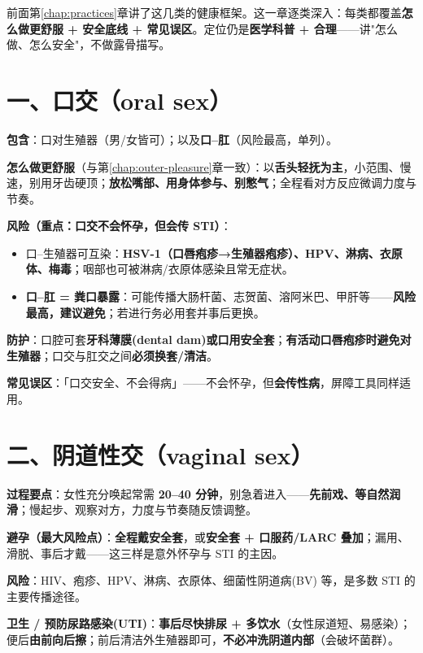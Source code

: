 \documentclass[12pt,UTF8,openany]{ctexbook}
\begin{document}
\label{chap:threeparts}

前面第\ref{chap:practices}章讲了这几类的健康框架。这一章逐类深入：每类都覆盖\textbf{怎么做更舒服 + 安全底线 + 常见误区}。定位仍是\textbf{医学科普 + 合理}——讲"怎么做、怎么安全"，不做露骨描写。

\section{一、口交（oral sex）}

\textbf{包含}：口对生殖器（男/女皆可）；以及\textbf{口--肛}（风险最高，单列）。

\textbf{怎么做更舒服}（与第\ref{chap:outer-pleasure}章一致）：以\textbf{舌头轻抚为主}，小范围、慢速，别用牙齿硬顶；\textbf{放松嘴部、用身体参与、别憋气}；全程看对方反应微调力度与节奏。

\textbf{风险（重点：口交不会怀孕，但会传 STI）}：
\begin{itemize}[leftmargin=2em,itemsep=0.3em]
  \item 口--生殖器可互染：\textbf{HSV-1（口唇疱疹→生殖器疱疹）、HPV、淋病、衣原体、梅毒}；咽部也可被淋病/衣原体感染且常无症状。
  \item \textbf{口--肛 = 粪口暴露}：可能传播大肠杆菌、志贺菌、溶阿米巴、甲肝等——\textbf{风险最高，建议避免}；若进行务必用套并事后更换。
\end{itemize}

\textbf{防护}：口腔可套\textbf{牙科薄膜(dental dam)或口用安全套}；\textbf{有活动口唇疱疹时避免对生殖器}；口交与肛交之间\textbf{必须换套/清洁}。

\textbf{常见误区}：「口交安全、不会得病」——不会怀孕，但\textbf{会传性病}，屏障工具同样适用。

\section{二、阴道性交（vaginal sex）}

\textbf{过程要点}：女性充分唤起常需 \textbf{20--40 分钟}，别急着进入——\textbf{先前戏、等自然润滑}；慢起步、观察对方，力度与节奏随反馈调整。

\textbf{避孕（最大风险点）}：\textbf{全程戴安全套}，或\textbf{安全套 + 口服药/LARC 叠加}；漏用、滑脱、事后才戴——这三样是意外怀孕与 STI 的主因。

\textbf{风险}：HIV、疱疹、HPV、淋病、衣原体、细菌性阴道病(BV) 等，是多数 STI 的主要传播途径。

\textbf{卫生 / 预防尿路感染(UTI)}：\textbf{事后尽快排尿 + 多饮水}（女性尿道短、易感染）；便后\textbf{由前向后擦}；前后清洁外生殖器即可，\textbf{不必冲洗阴道内部}（会破坏菌群）。
\end{document}
